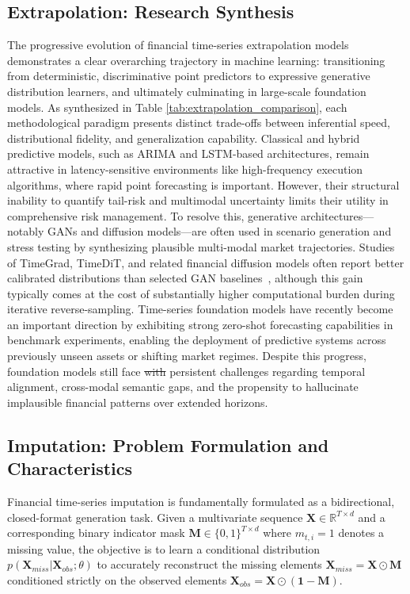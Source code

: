 \documentclass[11pt,a4paper]{article}
\makeatletter
\providecommand{\DIFdeltex}[1]{{\protect\color{red}\sout{#1}}} %
\providecommand{\DIFdelbegin}{} %
\providecommand{\DIFdelend}{} %
\providecommand{\DIFdel}[1]{\texorpdfstring{\DIFdeltex{#1}}{}} %
\providecommand{\DIFscaledelfig}{0.5}
\newlength{\DIFdelgraphicswidth} %
\newlength{\DIFdelgraphicsheight} %
\providecommand{\DIFdelincludegraphics}[2][]{%
\sbox{\DIFdelgraphicsbox}{\DIFOincludegraphics[#1]{#2}}%
\settoboxwidth{\DIFdelgraphicswidth}{\DIFdelgraphicsbox} %
\settoboxtotalheight{\DIFdelgraphicsheight}{\DIFdelgraphicsbox} %
\scalebox{\DIFscaledelfig}{%
\parbox[b]{\DIFdelgraphicswidth}{\usebox{\DIFdelgraphicsbox}\\[-\baselineskip] \rule{\DIFdelgraphicswidth}{0em}}\llap{\resizebox{\DIFdelgraphicswidth}{\DIFdelgraphicsheight}{%
\setlength{\unitlength}{\DIFdelgraphicswidth}%
\begin{picture}(1,1)%
\thicklines\linethickness{2pt} %
{\color[rgb]{1,0,0}\put(0,0){\framebox(1,1){}}}%
{\color[rgb]{1,0,0}\put(0,0){\line( 1,1){1}}}%
{\color[rgb]{1,0,0}\put(0,1){\line(1,-1){1}}}%
\end{picture}%
}\hspace*{3pt}}} %
} %
\DeclareRobustCommand{\DIFdelbegin}{\DIFOdelbegin \let\includegraphics\DIFdelincludegraphics} %
\DeclareRobustCommand{\DIFdelend}{\DIFOaddend \let\includegraphics\DIFOincludegraphics} %
\let\sout@orig\sout %
\renewcommand{\sout}[1]{\ifmmode\text{\sout@orig{\ensuremath{#1}}}\else\sout@orig{#1}\fi} %
\makeatother
\begin{document}
\subsection{Extrapolation: Research Synthesis}
The progressive evolution of financial time-series extrapolation models demonstrates a clear overarching trajectory in machine learning: transitioning from deterministic, discriminative point predictors to expressive generative distribution learners, and ultimately culminating in large-scale foundation models. As synthesized in Table \ref{tab:extrapolation_comparison}, each methodological paradigm presents distinct trade-offs between inferential speed, distributional fidelity, and generalization capability. Classical and hybrid predictive models, such as ARIMA and LSTM-based architectures, remain attractive in latency-sensitive environments like high-frequency execution algorithms, where rapid point forecasting is important. However, their structural inability to quantify tail-risk and multimodal uncertainty limits their utility in comprehensive risk management. To resolve this, generative architectures—notably GANs and diffusion models—are often used in scenario generation and stress testing by synthesizing plausible multi-modal market trajectories. Studies of TimeGrad, TimeDiT, and related financial diffusion models often report better calibrated distributions than selected GAN baselines~\citep{rasul2021timegrad,cao2024timedit,tanaka2025cofindiff}, although this gain typically comes at the cost of substantially higher computational burden during iterative reverse-sampling. Time-series foundation models have recently become an important direction by exhibiting strong zero-shot forecasting capabilities in benchmark experiments, enabling the deployment of predictive systems across previously unseen assets or shifting market regimes. Despite this progress, foundation models still face \DIFdelbegin \DIFdel{with }\DIFdelend persistent challenges regarding temporal alignment, cross-modal semantic gaps, and the propensity to hallucinate implausible financial patterns over extended horizons.


\subsection{Imputation: Problem Formulation and Characteristics}
\label{sec:imputation}

Financial time-series imputation is fundamentally formulated as a bidirectional, closed-format generation task. Given a multivariate sequence $\mathbf{X} \in \mathbb{R}^{T \times d}$ and a corresponding binary indicator mask $\mathbf{M} \in \{0, 1\}^{T \times d}$ where $m_{t,i} = 1$ denotes a missing value, the objective is to learn a conditional distribution $p(\mathbf{X}_{miss} | \mathbf{X}_{obs}; \theta)$ to accurately reconstruct the missing elements $\mathbf{X}_{miss} = \mathbf{X} \odot \mathbf{M}$ conditioned strictly on the observed elements $\mathbf{X}_{obs} = \mathbf{X} \odot (\mathbf{1} - \mathbf{M})$.
\end{document}
